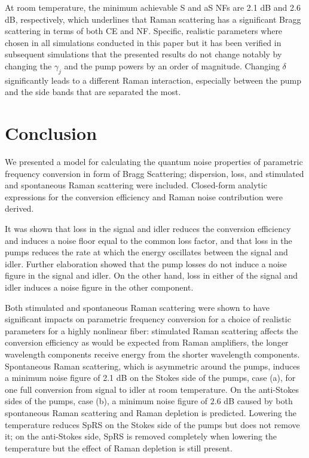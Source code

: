 \documentclass[10pt,letterpaper]{article}
\begin{document}
At room temperature, the minimum achievable S and aS NFs are 2.1 dB and 2.6 dB, respectively, which underlines that Raman scattering has a significant Bragg scattering in terms of both CE and NF. Specific, realistic parameters where chosen in all simulations conducted in this paper but it has been verified in subsequent simulations that the presented results do not change notably by changing the $\gamma_j$ and the pump powers by an order of magnitude. Changing $\delta$ significantly leads to a different Raman interaction, especially between the pump and the side bands that are separated the most. 


%
%
%
%
\section{Conclusion}
We presented a model for calculating the quantum noise properties of parametric frequency conversion in form of Bragg Scattering; dispersion, loss, and stimulated and spontaneous Raman scattering were included. Closed-form analytic expressions for the conversion efficiency and Raman noise contribution were derived.

It was shown that loss in the signal and idler reduces the conversion efficiency and induces a noise floor equal to the common loss factor, and that loss in the pumps reduces the rate at which the energy oscillates between the signal and idler. Further elaboration showed that the pump losses do not induce a noise figure in the signal and idler. On the other hand, loss in either of the signal and idler induces a noise figure in the other component.

Both stimulated and spontaneous Raman scattering were shown to have significant impacts on parametric frequency conversion for a choice of realistic parameters for a highly nonlinear fiber: stimulated Raman scattering affects the conversion efficiency as would be expected from Raman amplifiers, the longer wavelength components receive energy from the shorter wavelength components. Spontaneous Raman scattering, which is asymmetric around the pumps, induces a minimum noise figure of 2.1 dB on the Stokes side of the pumps, case (a), for one full conversion from signal to idler at room temperature. On the anti-Stokes sides of the pumps, case (b), a minimum noise figure of $2.6$ dB caused by both spontaneous Raman scattering and Raman depletion is predicted. Lowering the temperature reduces SpRS on the Stokes side of the pumps but does not remove it; on the anti-Stokes side, SpRS is removed completely when lowering the temperature but the effect of Raman depletion is still present. 
\end{document}
